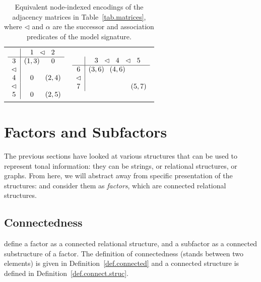 \begin{table}[ht]
	\centering
	\begin{tabular}{cc}
		$\begin{array}{c|c@{}c@{}c}
			& 1 & \lhd & 2 \\
			\hline
			3 & (1,3)  && 0 \\
			\lhd & && \\
			4 & 0 & & (2,4) \\
			\lhd & && \\
			5 & 0 & & (2,5) \\
		\end{array}$ \hspace{1em} &
		$\begin{array}{c|c@{}c@{}c@{}c@{}c}
			& 3 & \lhd & 4 & \lhd & 5 \\
			\hline
			6           & (3,6) &         & (4,6) &         &   	\\
			\lhd  &       &         &       &         &   	\\
			7           &       &         &       &         & (5,7) \\
		\end{array}$
	\end{tabular}
\caption{Equivalent node-indexed encodings of the adjacency matrices in Table~\ref{tab.matrices}, where $\lhd$ and $\alpha$ are the successor and association predicates of the model signature.}
	\label{tab.index}
\end{table}







\section{Factors and Subfactors}
\label{sec:factors}

The previous sections have looked at various structures that can be used to represent tonal information: they can be strings, or relational structures, or graphs. From here, we will abstract
away from specific presentation of the structures:
and consider them as \textit{factors}, which are connected relational structures. 

\subsection{Connectedness}
\citet{chandleeBufia2019} define a factor as a connected relational structure, and a subfactor as a connected substructure of a factor.
The definition of connectedness (stands between two elements) is given in Definition~\ref{def.connected} and a connected structure is defined in Definition~\ref{def.connect.struc}.

